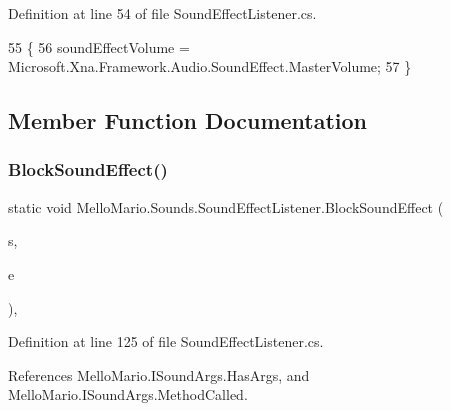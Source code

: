 Definition at line 54 of file Sound\+Effect\+Listener.\+cs.


\begin{DoxyCode}
55         \{
56             soundEffectVolume = Microsoft.Xna.Framework.Audio.SoundEffect.MasterVolume;
57         \}
\end{DoxyCode}


\subsection{Member Function Documentation}
\mbox{\label{classMelloMario_1_1Sounds_1_1SoundEffectListener_ab3072863b40fecafc6770fad52532459}} 
\subsubsection{Block\+Sound\+Effect()}
{\footnotesize\ttfamily static void Mello\+Mario.\+Sounds.\+Sound\+Effect\+Listener.\+Block\+Sound\+Effect (\begin{DoxyParamCaption}\item[{\textbf{ I\+Soundable}}]{s,  }\item[{\textbf{ I\+Sound\+Args}}]{e }\end{DoxyParamCaption})\hspace{0.3cm}{\ttfamily [static]}, {\ttfamily [private]}}



Definition at line 125 of file Sound\+Effect\+Listener.\+cs.



References Mello\+Mario.\+I\+Sound\+Args.\+Has\+Args, and Mello\+Mario.\+I\+Sound\+Args.\+Method\+Called.


